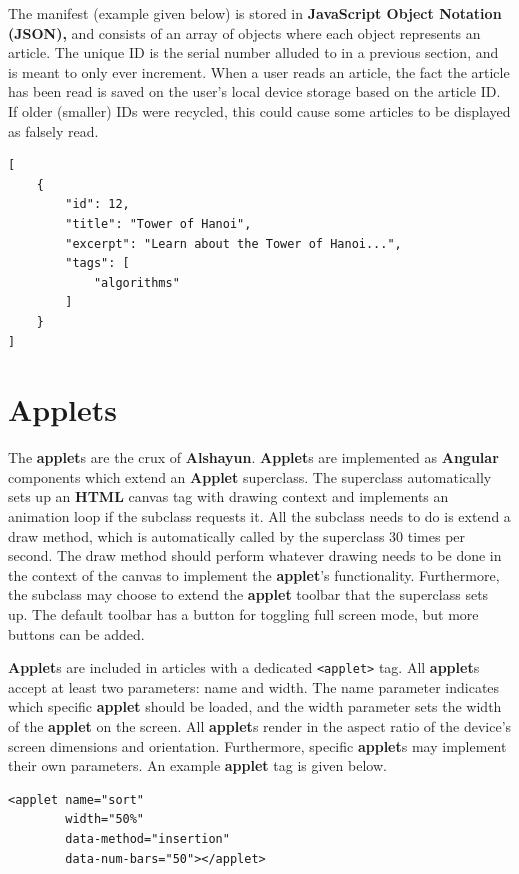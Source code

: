 \documentclass[12pt]{report}
\begin{document}
The manifest (example given below) is stored in \textbf{JavaScript Object
Notation (JSON),} and consists of an array of objects where each object
represents an article. The unique ID is the serial number alluded to in a
previous section, and is meant to only ever increment. When a user reads an
article, the fact the article has been read is saved on the user's local device
storage based on the article ID. If older (smaller) IDs were recycled, this
could cause some articles to be displayed as falsely read.

\begin{verbatim}
[
    {
        "id": 12,
        "title": "Tower of Hanoi",
        "excerpt": "Learn about the Tower of Hanoi...",
        "tags": [
            "algorithms"
        ]
    }
]
\end{verbatim}

    \section{Applets}

The \textbf{applet}s are the crux of \textbf{Alshayun}. \textbf{Applet}s are
implemented as \textbf{Angular} components which extend an \textbf{Applet}
superclass. The superclass automatically sets up an \textbf{HTML} canvas tag
with drawing context and implements an animation loop if the subclass requests
it. All the subclass needs to do is extend a draw method, which is automatically
called by the superclass 30 times per second. The draw method should perform
whatever drawing needs to be done in the context of the canvas to implement the
\textbf{applet}'s functionality. Furthermore, the subclass may choose to extend
the \textbf{applet} toolbar that the superclass sets up. The default toolbar has
a button for toggling full screen mode, but more buttons can be added.

\textbf{Applet}s are included in articles with a dedicated \texttt{<applet>}
tag. All \textbf{applet}s accept at least two parameters: name and width. The
name parameter indicates which specific \textbf{applet} should be loaded, and
the width parameter sets the width of the \textbf{applet} on the screen. All
\textbf{applet}s render in the aspect ratio of the device's screen dimensions
and orientation. Furthermore, specific \textbf{applet}s may implement their own
parameters. An example \textbf{applet} tag is given below.

\begin{verbatim}
<applet name="sort"
        width="50%"
        data-method="insertion"
        data-num-bars="50"></applet>
\end{verbatim}
\end{document}
